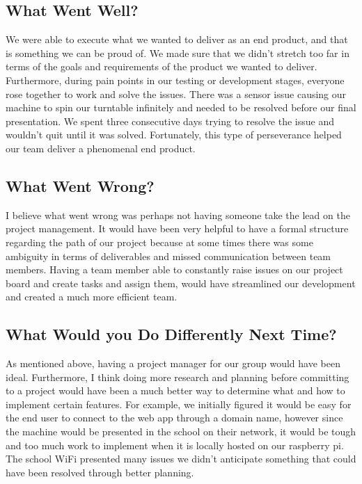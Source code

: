 \documentclass{article}
\begin{document}
\subsection{What Went Well?}
We were able to execute what we wanted to deliver as an end product, and that is something we can be proud of. We made sure that we didn't stretch too far in terms of the goals and requirements of the product we wanted to deliver. Furthermore, during pain points in our testing or development stages, everyone rose together to work and solve the issues. There was a sensor issue causing our machine to spin our turntable infinitely and needed to be resolved before our final presentation. We spent three consecutive days trying to resolve the issue and wouldn't quit until it was solved. Fortunately, this type of perseverance helped our team deliver a phenomenal end product. 

\subsection{What Went Wrong?}
I believe what went wrong was perhaps not having someone take the lead on the project management. It would have been very helpful to have a formal structure regarding the path of our project because at some times there was some ambiguity in terms of deliverables and missed communication between team members. Having a team member able to constantly raise issues on our project board and create tasks and assign them, would have streamlined our development and created a much more efficient team.

\subsection{What Would you Do Differently Next Time?}
As mentioned above, having a project manager for our group would have been ideal. Furthermore, I think doing more research and planning before committing to a project would have been a much better way to determine what and how to implement certain features. For example, we initially figured it would be easy for the end user to connect to the web app through a domain name, however since the machine would be presented in the school on their network, it would be tough and too much work to implement when it is locally hosted on our raspberry pi. The school WiFi presented many issues we didn't anticipate something that could have been resolved through better planning.
\end{document}
